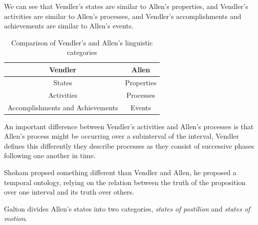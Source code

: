 We can see that Vendler's states are similar to Allen's properties, and Vendler's activities are similar to Allen's processes, and Vendler's accomplishments and achievements are similar to Allen's events.

\begin{table}[h]
	\centering
	\begin{tabular}{|c|c|}
		\hline
		\textbf{Vendler}                 & \textbf{Allen} \\
		\hline
		States                           & Properties     \\
		Activities                       & Processes      \\
		Accomplishments and Achievements & Events         \\
		\hline
	\end{tabular}
	\caption{Comparison of Vendler's and Allen's linguistic categories}
	\label{tab:comparison}
\end{table}

An important difference between Vendler's activities and Allen's processes is that Allen's process might be occurring over a subinterval of the interval,
Vendler defines this differently they describe processes as they consist of successive phases following one another in time.


Shoham propsed something different than Vendler and Allen, he proposed a temporal ontology, relying on the relation between the truth of the proposition
over one interval and its truth over others.

Galton divides Allen's states into two categories, \textit{states of postilion} and \textit{states of motion}.
